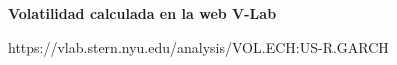 	\begin{figure}[H]
		\centering
		\textbf{Volatilidad calculada en la web V-Lab}\par\medskip
		\caption{https://vlab.stern.nyu.edu/analysis/VOL.ECH:US-R.GARCH}\label{figVd42}
	\end{figure}

